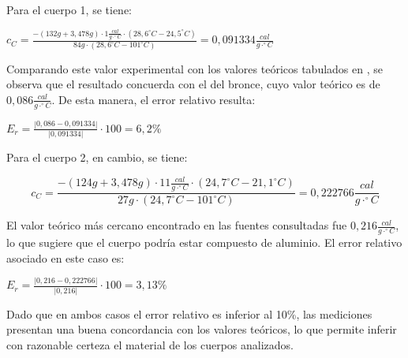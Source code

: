 \documentclass[12pt, a4paper]{article}
\begin{document}
Para el cuerpo 1, se tiene:

\begin{center}
    $ c_C = \frac{ - (132g + 3,478g) \cdot 1 \frac{cal}{g \cdot ^\circ C} \cdot (28,6^\circ C - 24,5^\circ C) }{ 84g \cdot (28,6^\circ C - 101^\circ C) } = 0,091334 \frac{cal}{g \cdot ^\circ C} $
\end{center}

Comparando este valor experimental con los valores teóricos tabulados en \cite{educamix_capacidad, fisicanet_calor}, se observa que el resultado concuerda con el del bronce, cuyo valor teórico es de $ 0,086 \frac{cal}{g \cdot ^\circ C} $. De esta manera, el error relativo resulta:

\begin{center}
    $ E_r =  \frac{|0,086-0,091334|}{|0,091334|}\cdot 100 = 6,2 \% $
\end{center}

Para el cuerpo 2, en cambio, se tiene:

\begin{equation}
    c_C = \frac{ - (124g + 3,478g) \cdot 11 \frac{cal}{g \cdot ^\circ C} \cdot (24,7^\circ C - 21,1^\circ C) }{ 27g \cdot (24,7^\circ C - 101^\circ C)} = 0,222766 \frac{cal}{g \cdot ^\circ C}
\end{equation}

El valor teórico más cercano encontrado en las fuentes consultadas \cite{educamix_capacidad,fisicanet_calor} fue $ 0,216 \frac{cal}{g \cdot ^\circ C} $, lo que sugiere que el cuerpo podría estar compuesto de aluminio. El error relativo asociado en este caso es:
\begin{center}
    $ E_r =  \frac{|0,216-0,222766|}{|0,216|}\cdot 100 = 3,13 \% $
\end{center}

Dado que en ambos casos el error relativo es inferior al 10\%, las mediciones presentan una buena concordancia con los valores teóricos, lo que permite inferir con razonable certeza el material de los cuerpos analizados.


\newpage
 
\end{document}
